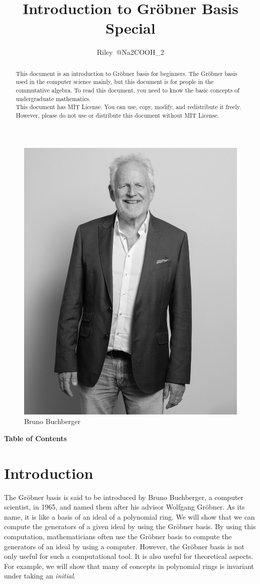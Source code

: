 \documentclass{article}
\title{Introduction to Gr\"{o}bner Basis Special}
\author{Riley~@Na2COOH\_2}
\makeatletter
\renewcommand{\tableofcontents}{%
\@mkboth{\contentsname}{\contentsname}%
\@starttoc{toc}%
}
\makeatother
\begin{document}
\pagestyle{empty}
\maketitle
\begin{abstract}
    This document is an introduction to Gr\"{o}bner basis for beginners. The Gr\"{o}bner basis used in the computer science mainly, but this document is for people in the commutative algebra. To read this document, you need to know the basic concepts of undergraduate mathematics. \\ 
    This document has MIT License. You can use, copy, modify, and redistribute it freely. However, please do not use or distribute this document without MIT License.
\end{abstract}

\begin{figure}[htbp]
    \centering
    \includegraphics[width=0.5\columnwidth]{./Bruno_Buchberger.jpg}
    \caption{Bruno Buchberger}
\end{figure}

\newpage

\setlength{\columnseprule}{0.5pt}
\hypertarget{toc_page}{}
\noindent\textbf{\Large Table of Contents}
\begin{multicols*}{2}
    \tableofcontents
\end{multicols*}
\pagestyle{fancy}
\setlength{\headheight}{13.6pt} %
\addtolength{\topmargin}{-1.6pt} %
\newpage

\section{Introduction}
The Gr\"{o}bner basis is said to be introduced by Bruno Buchberger, a computer scientist, in 1965, and named them after his advisor Wolfgang Gr\"{o}bner. As its name, it is like a basis of an ideal of a polynomial ring. We will show that we can compute the generators of a given ideal by using the Gr\"{o}bner basis. By using this computation, mathematicians often use the Gr\"{o}bner basis to compute the generators of an ideal by using a computer. However, the Gr\"{o}bner basis is not only useful for such a computational tool. It is also useful for theoretical aspects. For example, we will show that many of concepts in polynomial rings is invariant under taking an \textit{initial}.
\end{document}
